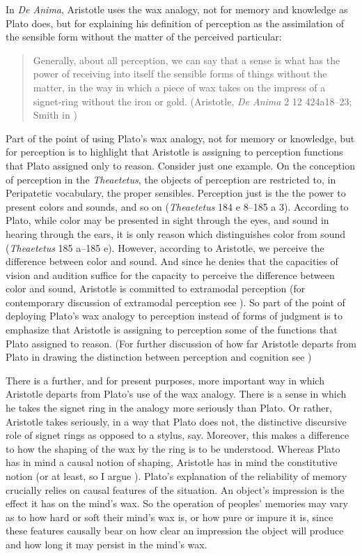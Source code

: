 In \emph{De Anima}, Aristotle uses the wax analogy, not for memory and knowledge as Plato does, but for explaining his definition of perception as the assimilation of the sensible form without the matter of the perceived particular:
\begin{quote}
	Generally, about all perception, we can say that a sense is what has the power of receiving into itself the sensible forms of things without the matter, in the way in which a piece of wax takes on the impress of a signet-ring without the iron or gold. (Aristotle, \emph{De Anima} 2 12 424a18–23; Smith in \citealt[42--43]{Barnes:1984uq})
\end{quote}
Part of the point of using Plato's wax analogy, not for memory or knowledge, but for perception is to highlight that Aristotle is assigning to perception functions that Plato assigned only to reason. Consider just one example. On the conception of perception in the \emph{Theaetetus}, the objects of perception are restricted to, in Peripatetic vocabulary, the proper sensibles. Perception just is the the power to present colors and sounds, and so on (\emph{Theaetetus} 184 e 8--185 a 3). According to Plato, while color may be presented in sight through the eyes, and sound in hearing through the ears, it is only reason which distinguishes color from sound (\emph{Theaetetus} 185 a--185 e). However, according to Aristotle, we perceive the difference between color and sound. And since he denies that the capacities of vision and audition suffice for the capacity to perceive the difference between color and sound, Aristotle is committed to extramodal perception (for contemporary discussion of extramodal perception see \citealt{OCallaghan:2015ty}). So part of the point of deploying Plato's wax analogy to perception instead of forms of judgment is to emphasize that Aristotle is assigning to perception some of the functions that Plato assigned to reason. (For further discussion of how far Aristotle departs from Plato in drawing the distinction between perception and cognition see \citealt{Sorabji:1971fr,Sorabji:2003fk,Kalderon:2015fr})

There is a further, and for present purposes, more important way in which Aristotle departs from Plato's use of the wax analogy. There is a sense in which he takes the signet ring in the analogy more seriously than Plato. Or rather, Aristotle takes seriously, in a way that Plato does not, the distinctive discursive role of signet rings as opposed to a stylus, say. Moreover, this makes a difference to how the shaping of the wax by the ring is to be understood. Whereas Plato has in mind a causal notion of shaping, Aristotle has in mind the constitutive notion (or at least, so I argue \citealt[chapter 9]{Kalderon:2015fr}). Plato’s explanation of the reliability of memory crucially relies on causal features of the situation. An object’s impression is the effect it has on the mind’s wax. So the operation of peoples' memories may vary as to how hard or soft their mind's wax is, or how pure or impure it is, since these features causally bear on how clear an impression the object will produce and how long it may persist in the mind's wax. 

